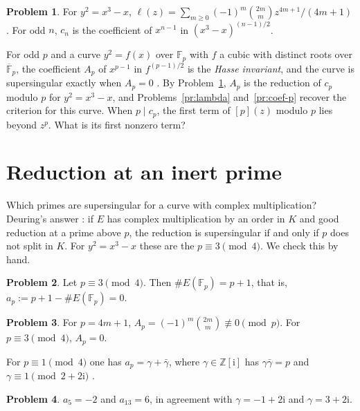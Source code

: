 \documentclass[reqno]{amsart}
\theoremstyle{definition}
\newtheorem{problem}{Problem}[section]
\theoremstyle{plain}
\newcommand{\Z}{\mathbb{Z}}
\newcommand{\F}{\mathbb{F}}
\newcommand{\ii}{\mathrm{i}}
\begin{document}
\begin{problem}\label{pr:log}
For \(y^2 = x^3 - x\), \(\ell(z) = \sum_{m \ge 0} (-1)^m \binom{2m}{m} z^{4m+1}/(4m+1)\).  For odd \(n\), \(c_n\) is the coefficient of \(x^{n-1}\) in \((x^3 - x)^{(n-1)/2}\).
\end{problem}

For odd \(p\) and a curve \(y^2 = f(x)\) over \(\F_p\) with \(f\) a cubic with distinct roots over \(\overline{\F}_p\), the coefficient \(A_p\) of \(x^{p-1}\) in \(f^{(p-1)/2}\) is the \emph{Hasse invariant}, and the curve is supersingular exactly when \(A_p = 0\) \cite[Thm.~V.4.1(a)]{Si1}.  By Problem~\ref{pr:log}, \(A_p\) is the reduction of \(c_p\) modulo \(p\) for \(y^2 = x^3 - x\), and Problems~\ref{pr:lambda} and~\ref{pr:coef-p} recover the criterion for this curve.  When \(p \mid c_p\), the first term of \([p](z)\) modulo \(p\) lies beyond \(z^p\).  What is its first nonzero term?

\section{Reduction at an inert prime}\label{sec:reduction}

Which primes are supersingular for a curve with complex multiplication?  Deuring's answer \cite{Deu41}: if \(E\) has complex multiplication by an order in \(K\) and good reduction at a prime above \(p\), the reduction is supersingular if and only if \(p\) does not split in \(K\).  For \(y^2 = x^3 - x\) these are the \(p \equiv 3 \pmod 4\).  We check this by hand.

\begin{problem}\label{pr:count}
Let \(p \equiv 3 \pmod 4\).  Then \(\#E(\F_p) = p + 1\), that is, \(a_p := p + 1 - \#E(\F_p) = 0\).
\end{problem}

\begin{problem}\label{pr:hasse-x3x}
For \(p = 4m+1\), \(A_p = (-1)^m \binom{2m}{m} \not\equiv 0 \pmod p\).  For \(p \equiv 3 \pmod 4\), \(A_p = 0\).
\end{problem}

For \(p \equiv 1 \pmod 4\) one has \(a_p = \gamma + \bar\gamma\), where \(\gamma \in \Z[\ii]\) has \(\gamma\bar\gamma = p\) and \(\gamma \equiv 1 \pmod{2 + 2\ii}\) \cite[Ch.~18]{IR}.

\begin{problem}\label{pr:ap-split}
\(a_5 = -2\) and \(a_{13} = 6\), in agreement with \(\gamma = -1 + 2\ii\) and \(\gamma = 3 + 2\ii\).
\end{problem}
\end{document}
